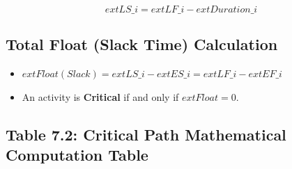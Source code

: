 \documentclass[12pt,a4paper,oneside]{report}
\begin{document}
$$	ext{LS}\_i = 	ext{LF}\_i - 	ext{Duration}\_i$$

\subsection{Total Float (Slack Time) Calculation}

\begin{itemize}
  \item $	ext{Float (Slack)} = 	ext{LS}\_i - 	ext{ES}\_i = 	ext{LF}\_i - 	ext{EF}\_i$
  \item An activity is \textbf{Critical} if and only if $	ext{Float} = 0$.
\end{itemize}

\subsection{Table 7.2: Critical Path Mathematical Computation Table}
\end{document}
